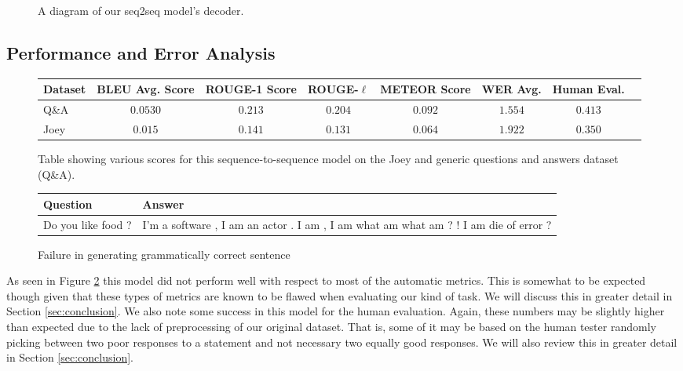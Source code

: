 \begin{figure}
	\begin{center}
	\end{center}
	\caption{A diagram of our seq2seq model's decoder.}
	\label{fig:s2s_model_decoder}
\end{figure} 

\subsection{Performance and Error Analysis}

\begin{figure}
\begin{center}
	\scalebox{.8}
	{
	\begin{tabular}{ |l|c|c|c|c|c|c|c| } 
		\hline
		\textbf{Dataset} & \textbf{BLEU Avg. Score} & \textbf{ROUGE-1 Score} & \textbf{ROUGE-$\ell$} & \textbf{METEOR Score} & \textbf{WER Avg.} & \textbf{Human Eval.}\\
		\hline
		Q\&A & $0.0530$ & $0.213$ & $0.204$ & $0.092$ & $1.554$ & $0.413$\\
		\hline
		Joey & $0.015$ & $0.141$ & $0.131$ & $0.064$ & $1.922$ & $0.350$\\ 
		\hline
	\end{tabular}
	}
\end{center}
\label{fig:s2s_data}
\caption{Table showing various scores for this sequence-to-sequence model on the Joey and generic questions and answers dataset (Q\&A).}
\end{figure}

\begin{figure}
\begin{center}
	\scalebox{.8}
	{
	\begin{tabular}{ |L|L| } 
		\hline
		\textbf{Question} & \textbf{Answer} \\
		\hline
		 Do you like food ? & I'm a software , I am an actor . I am , I am what am what am ? ! I am die of error ? \\
		\hline
	\end{tabular}
	}
\end{center}
\label{fig:s2s_errors}
\caption{Failure in generating grammatically correct sentence}
\end{figure}

As seen in Figure \ref{fig:s2s_data} this model did not perform well with respect to most of the automatic metrics.
This is somewhat to be expected though given that these types of metrics are known to be flawed when evaluating our kind of task.
We will discuss this in greater detail in Section \ref{sec:conclusion}.
We also note some success in this model for the human evaluation.
Again, these numbers may be slightly higher than expected due to the lack of preprocessing of our original dataset.
That is, some of it may be based on the human tester randomly picking between two poor responses to a statement and not necessary two equally good responses. 
We will also review this in greater detail in Section \ref{sec:conclusion}.

